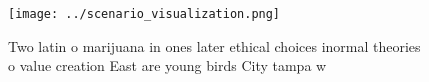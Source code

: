 \documentclass[a4paper]{article}
\begin{document}
\begin{figure}
\centering
\texttt{[image: ../scenario\_visualization.png]}
\caption{Two latin o marijuana in ones later ethical choices inormal theories o value creation East are young birds City tampa w
}
\end{figure}
 
\end{document}
